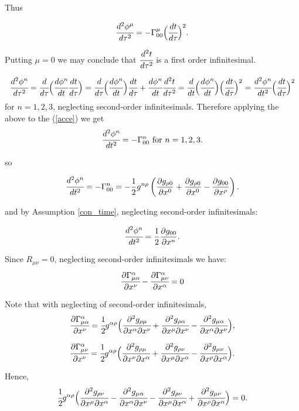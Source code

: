 \documentclass[main.tex]{subfiles}
\begin{document}
Thus

\begin{equation}\label{acce}
\cfrac{d^2\phi^\mu}{d\tau^2} = -\Gamma^\mu_{00}\Big(\cfrac{dt}{d\tau}\Big)^2.
\end{equation}

Putting $\mu = 0$ we may conclude that $\cfrac{d^2t}{d\tau^2}$ is a first order infinitesimal.

$$
\cfrac{d^2\phi^n}{d\tau^2} = \cfrac{d}{d\tau}\Big(\cfrac{d\phi^n}{dt}\cfrac{dt}{d\tau}\Big) = 
\cfrac{d}{d\tau}\Big(\cfrac{d\phi^n}{dt}\Big)\cfrac{dt}{d\tau} + \cfrac{d\phi^n}{dt}\cfrac{d^2t}{d\tau^2} = 
\cfrac{d}{dt}\Big(\cfrac{d\phi^n}{dt}\Big)\Big(\cfrac{dt}{d\tau}\Big)^2 = \cfrac{d^2\phi^n}{dt^2}\Big(\cfrac{dt}{d\tau}\Big)^2
$$
for $n=1,2,3$, neglecting second-order infinitesimals.
Therefore applying the above to the (\ref{acce}) we get
$$
\cfrac{d^2\phi^n}{dt^2} = -\Gamma^n_{00} \text{ for } n=1,2,3.
$$

so 

$$
\cfrac{d^2\phi^n}{dt^2} = -\Gamma^n_{00} = -\frac{1}{2} g^{n\rho} \left( \frac{\partial g_{\rho 0}}{\partial x^0} + \frac{\partial g_{\rho 0}}{\partial x^0} - \frac{\partial g_{0 0}}{\partial x^\rho} \right).
$$

and by Assumption \ref{con_time}, neglecting second-order infinitesimals:

$$
\cfrac{d^2\phi^n}{dt^2} = \frac{1}{2} \frac{\partial g_{0 0}}{\partial x^n}.
$$

Since $R_{\mu\nu} = 0$, neglecting second-order infinitesimals we have:
$$
\cfrac{\partial \Gamma^\alpha_{\mu\alpha}}{\partial x^\nu}
- \cfrac{\partial \Gamma^\alpha_{\mu\nu}}{\partial x^\alpha} = 0
$$

Note that with neglecting of second-order infinitesimals,
$$
\cfrac{\partial \Gamma^\alpha_{\mu\alpha}}{\partial x^\nu} = \cfrac{1}{2}g^{\alpha\rho}\Big(
\cfrac{\partial^2 g_{\rho \mu}}{\partial x^\alpha \partial x^\nu} 
+ \cfrac{\partial^2 g_{\rho \alpha}}{\partial x^\mu \partial x^\nu} 
- \cfrac{\partial^2 g_{\mu\alpha}}{\partial x^\alpha \partial x^\nu}\Big),
$$

$$
\cfrac{\partial \Gamma^\alpha_{\mu\nu}}{\partial x^\nu} = \cfrac{1}{2}g^{\alpha\rho}\Big(
\cfrac{\partial^2 g_{\rho \mu}}{\partial x^\nu \partial x^\alpha} 
+ \cfrac{\partial^2 g_{\rho \nu}}{\partial x^\mu \partial x^\alpha} 
- \cfrac{\partial^2 g_{\mu\nu}}{\partial x^\rho \partial x^\alpha}\Big).
$$

Hence,
$$
\cfrac{1}{2}g^{\alpha\rho}
\Big(
\cfrac{\partial^2 g_{\rho \nu}}{\partial x^\mu \partial x^\alpha} 
- \cfrac{\partial^2 g_{\mu\alpha}}{\partial x^\alpha \partial x^\nu}
- \cfrac{\partial^2 g_{\rho \nu}}{\partial x^\mu \partial x^\alpha}
+ \cfrac{\partial^2 g_{\mu\nu}}{\partial x^\rho \partial x^\alpha}
\Big) = 0.
$$
\end{document}
